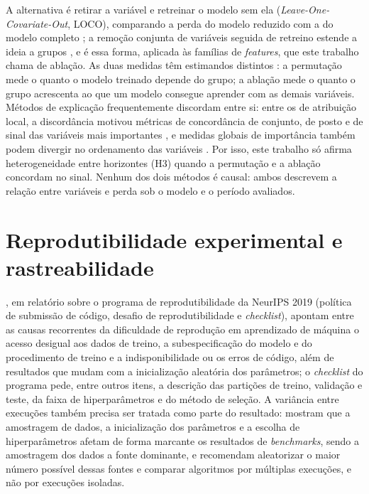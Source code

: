 A alternativa é retirar a variável e retreinar o modelo sem ela (\textit{Leave-One-Covariate-Out}, LOCO), comparando a perda do modelo reduzido com a do modelo completo \cite{LEI2018}; a remoção conjunta de variáveis seguida de retreino estende a ideia a grupos \cite{HOOKER2021}, e é essa forma, aplicada às famílias de \textit{features}, que este trabalho chama de ablação. As duas medidas têm estimandos distintos \cite{HOOKER2021,LEI2018}: a permutação mede o quanto o modelo treinado depende do grupo; a ablação mede o quanto o grupo acrescenta ao que um modelo consegue aprender com as demais variáveis. Métodos de explicação frequentemente discordam entre si: entre os de atribuição local, a discordância motivou métricas de concordância de conjunto, de posto e de sinal das variáveis mais importantes \cite{KRISHNA2024}, e medidas globais de importância também podem divergir no ordenamento das variáveis \cite{HOOKER2021}. Por isso, este trabalho só afirma heterogeneidade entre horizontes (H3) quando a permutação e a ablação concordam no sinal. Nenhum dos dois métodos é causal: ambos descrevem a relação entre variáveis e perda sob o modelo e o período avaliados.

\section{Reprodutibilidade experimental e rastreabilidade}
, em relatório sobre o programa de reprodutibilidade da NeurIPS 2019 (política de submissão de código, desafio de reprodutibilidade e \textit{checklist}), apontam entre as causas recorrentes da dificuldade de reprodução em aprendizado de máquina o acesso desigual aos dados de treino, a subespecificação do modelo e do procedimento de treino e a indisponibilidade ou os erros de código, além de resultados que mudam com a inicialização aleatória dos parâmetros; o \textit{checklist} do programa pede, entre outros itens, a descrição das partições de treino, validação e teste, da faixa de hiperparâmetros e do método de seleção. A variância entre execuções também precisa ser tratada como parte do resultado:  mostram que a amostragem de dados, a inicialização dos parâmetros e a escolha de hiperparâmetros afetam de forma marcante os resultados de \textit{benchmarks}, sendo a amostragem dos dados a fonte dominante, e recomendam aleatorizar o maior número possível dessas fontes e comparar algoritmos por múltiplas execuções, e não por execuções isoladas.


